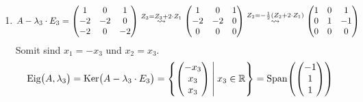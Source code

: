 \documentclass{scrreprt}
\begin{document}
\begin{enumerate}[(a)]
\begin{enumerate}[($\lambda_1$)]
  \item
    \[
      A - \lambda_3 \cdot E_3
      = \begin{pmatrix}
        1  & 0  & 1  \\
        -2 & -2 & 0  \\
        -2 & 0  & -2 \\
      \end{pmatrix}
      \overset{Z_3 = Z_3 + 2 \cdot Z_1}\leadsto \begin{pmatrix}
        1  & 0  & 1  \\
        -2 & -2 & 0  \\
        0  & 0  & 0 \\
      \end{pmatrix}
      \overset{Z_2 = -\frac{1}{2}\qty(Z_2 + 2 \cdot Z_1)}\leadsto \begin{pmatrix}
        1 & 0  & 1  \\
        0 & 1  & -1 \\
        0 & 0  & 0  \\
      \end{pmatrix}
    \]
    Somit sind $x_1 = -x_3$ und $x_2 = x_3$.
    \[
      \text{Eig}\qty\big(A, \lambda_3) =
      \text{Ker}\qty\big(A - \lambda_3 \cdot E_3) =
      \qty{
        \begin{pmatrix}
          -x_3 \\
          x_3  \\
          x_3  \\
        \end{pmatrix}
        \:\middle|\:
        x_3 \in \mathbb{R}
      } = \text{Span}\qty(\begin{pmatrix} -1 \\ 1 \\ 1 \end{pmatrix})
    \]
  \end{enumerate}


\end{enumerate}
\end{document}
